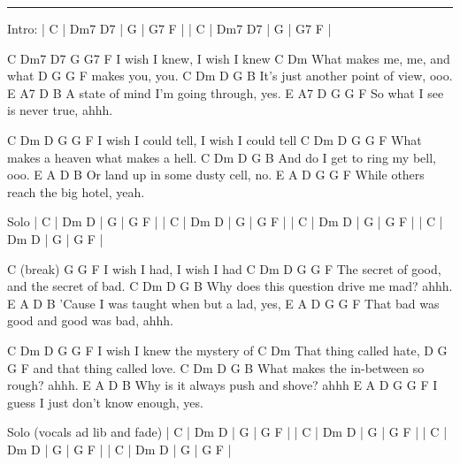 \noindent\rule{\columnwidth}{1pt}

\begin{multicols}{2}
\begin{lstsong}
Intro:
| C | Dm7 D7 | G | G7 F |
| C | Dm7 D7 | G | G7 F |

C          Dm7     D7     G      G7  F 
  I wish I knew, I wish I knew
C                Dm 
  What makes me, me, and what
D          G     G  F
makes you, you.
C            Dm     D        G     B
  It's just another point of view, ooo.
E            A7             D        B
  A state of mind I'm going through, yes.
E           A7           D     G      G  F
  So what I see is never true, ahhh.

C                Dm      D           G   G  F 
  I wish I could tell, I wish I could tell
C              Dm          D       G     G  F 
  What makes a heaven what makes a hell.
C          Dm     D       G     B
  And do I get to ring my bell, ooo.
E            A             D     B
  Or land up in some dusty cell, no.
E              A             D      G    G  F
  While others reach the big hotel, yeah.

Solo
| C | Dm D | G | G F |
| C | Dm D | G | G F |
| C | Dm D | G | G F |
| C | Dm D | G | G F |

C (break)                G       G  F 
  I wish I had, I wish I had
C               Dm            D        G G F 
  The secret of good, and the secret of bad.
C               Dm       D        G    B
  Why does this question drive me mad? ahhh.
E              A                 D    B
  'Cause I was taught when but a lad, yes,
E              A                 D    G  G F
  That bad was good and good was bad, ahhh.

C          Dm       D       G       G  F 
  I wish I knew the mystery of
C                   Dm
  That thing called hate,
         D            G       G  F 
and that thing called love.
C                Dm   D        G      B
  What makes the in-between so rough? ahhh.
E           A               D      B
  Why is it always push and shove? ahhh
E           A                D      G    G  F
  I guess I just don't know enough, yes.

Solo (vocals ad lib and fade)
| C | Dm D | G | G F |
| C | Dm D | G | G F |
| C | Dm D | G | G F |
| C | Dm D | G | G F |
\end{lstsong}
\end{multicols}
\newpage

